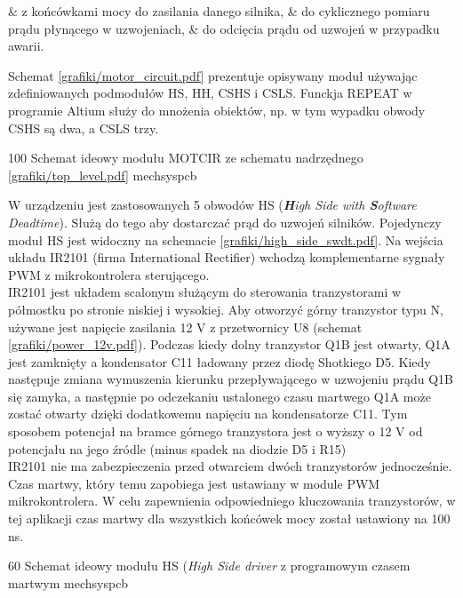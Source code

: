 \begin{easylist}
	& z końcówkami mocy do zasilania danego silnika,
	& do cyklicznego pomiaru prądu płynącego w uzwojeniach,
	& do odcięcia prądu od uzwojeń w przypadku awarii.
	\\
\end{easylist} 
	
Schemat \ref{grafiki/motor_circuit.pdf} prezentuje opisywany moduł używając zdefiniowanych podmodułów HS, HH, CSHS i CSLS. Funckja REPEAT w programie Altium służy do mnożenia obiektów, np. w tym wypadku obwody CSHS są dwa, a CSLS trzy.

\clearpage

	{100}
	{Schemat ideowy modułu MOTCIR ze schematu nadrzędnego \ref{grafiki/top_level.pdf}}
	{mechsyspcb}


W urządzeniu jest zastosowanych 5 obwodów HS (\textit{\textbf{H}igh Side with \textbf{S}oftware Deadtime}). Służą do tego aby dostarczać prąd do uzwojeń silników. Pojedynczy moduł HS jest widoczny na schemacie \ref{grafiki/high_side_swdt.pdf}. Na wejścia układu IR2101 (firma International Rectifier) wchodzą komplementarne sygnały PWM z mikrokontrolera sterującego. \\

IR2101 jest układem scalonym służącym do sterowania tranzystorami w półmostku po stronie niskiej i wysokiej. Aby otworzyć górny tranzystor typu N, używane jest napięcie zasilania 12 V z przetwornicy U8 (schemat \ref{grafiki/power_12v.pdf}). Podczas kiedy dolny tranzystor Q1B jest otwarty, Q1A jest zamknięty a kondensator C11 ładowany przez diodę Shotkiego D5. Kiedy następuje zmiana wymuszenia kierunku przepływającego w uzwojeniu prądu Q1B się zamyka, a następnie po odczekaniu ustalonego czasu martwego Q1A może zostać otwarty dzięki dodatkowemu napięciu na kondensatorze C11. Tym sposobem potencjał na bramce górnego tranzystora jest o wyższy o 12 V od potencjału na jego źródle (minus spadek na diodzie D5 i R15)\\
	
IR2101 nie ma zabezpieczenia przed otwarciem dwóch tranzystorów jednocześnie. Czas martwy, który temu zapobiega jest ustawiany w module PWM mikrokontrolera. W celu zapewnienia odpowiedniego kluczowania tranzystorów, w tej aplikacji czas martwy dla wszystkich końcówek mocy został ustawiony na 100 ns.

	{60}
	{Schemat ideowy modułu HS ({\it High Side driver} z programowym czasem martwym}
	{mechsyspcb}
	
